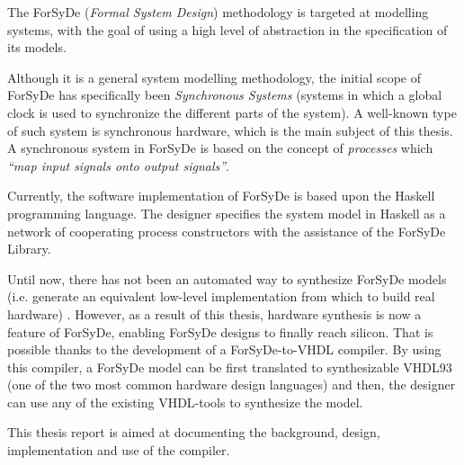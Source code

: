 
The ForSyDe (\textit{Formal System Design}) methodology
is targeted at modelling systems, with the goal of using a high level
of abstraction in the specification of its models.

Although it is a general system modelling methodology, the initial
scope of ForSyDe has specifically been \textit{Synchronous Systems}
(systems in which a global clock is used to synchronize the different
parts of the system). A well-known type of such system is synchronous
hardware, which is the main subject of this thesis. A synchronous
system in ForSyDe is based on the concept of \textit{processes} which
\textit{``map input signals onto output signals''}.

Currently, the software implementation of ForSyDe is based upon the
Haskell programming language. The designer specifies the
system model in Haskell as a network of cooperating process
constructors with the assistance of the ForSyDe Library.

Until now, there has not been an automated way to synthesize ForSyDe
models (i.e.  generate an equivalent low-level implementation from
which to build real hardware) .  However, as a result of this thesis,
hardware synthesis is now a feature of ForSyDe, enabling ForSyDe
designs to finally reach silicon.  That is possible thanks to the
development of a ForSyDe-to-VHDL compiler.  By using this compiler, a
ForSyDe model can be first translated to synthesizable
VHDL93 (one of the two most common hardware design
languages) and then, the designer can use any of the existing
VHDL-tools to synthesize the model.

This thesis report is aimed at documenting the background, design,
implementation and use of the compiler.
